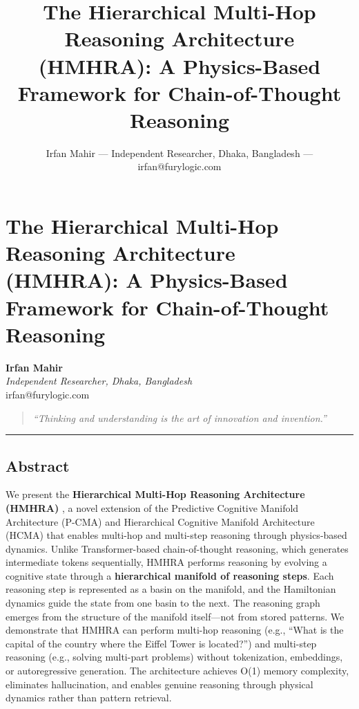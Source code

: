 \documentclass[
  11pt,
  a4paper,
]{article}
\title{The Hierarchical Multi-Hop Reasoning Architecture (HMHRA): A
Physics-Based Framework for Chain-of-Thought Reasoning}
\author{Irfan Mahir --- Independent Researcher, Dhaka, Bangladesh ---
irfan@furylogic.com}
\date{}
\begin{document}
\maketitle

{
\hypersetup{linkcolor=}
\setcounter{tocdepth}{3}
\tableofcontents
}
\section{The Hierarchical Multi-Hop Reasoning Architecture (HMHRA): A
Physics-Based Framework for Chain-of-Thought
Reasoning}\label{the-hierarchical-multi-hop-reasoning-architecture-hmhra-a-physics-based-framework-for-chain-of-thought-reasoning}

\textbf{Irfan Mahir}\\
\emph{Independent Researcher, Dhaka, Bangladesh}\\
irfan@furylogic.com

\begin{quote}
\emph{``Thinking and understanding is the art of innovation and
invention.''}
\end{quote}

\begin{center}\rule{0.5\linewidth}{0.5pt}\end{center}

\subsection{Abstract}\label{abstract}

We present the \textbf{Hierarchical Multi-Hop Reasoning Architecture
(HMHRA)} , a novel extension of the Predictive Cognitive Manifold
Architecture (P-CMA) and Hierarchical Cognitive Manifold Architecture
(HCMA) that enables multi-hop and multi-step reasoning through
physics-based dynamics. Unlike Transformer-based chain-of-thought
reasoning, which generates intermediate tokens sequentially, HMHRA
performs reasoning by evolving a cognitive state through a
\textbf{hierarchical manifold of reasoning steps}. Each reasoning step
is represented as a basin on the manifold, and the Hamiltonian dynamics
guide the state from one basin to the next. The reasoning graph emerges
from the structure of the manifold itself---not from stored patterns. We
demonstrate that HMHRA can perform multi-hop reasoning (e.g., ``What is
the capital of the country where the Eiffel Tower is located?'') and
multi-step reasoning (e.g., solving multi-part problems) without
tokenization, embeddings, or autoregressive generation. The architecture
achieves O(1) memory complexity, eliminates hallucination, and enables
genuine reasoning through physical dynamics rather than pattern
retrieval.
\end{document}
